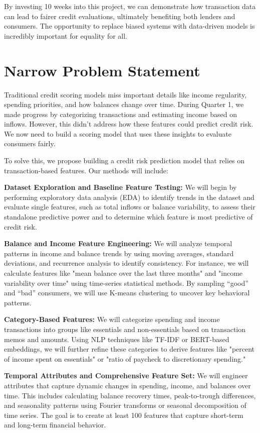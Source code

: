 \documentclass[12pt,letterpaper]{article}
\begin{document}
By investing 10 weeks into this project, we can demonstrate how transaction data can lead to fairer credit evaluations, ultimately benefiting both lenders and consumers. The opportunity to replace biased systems with data-driven models is incredibly important for equality for all.


\section{Narrow Problem Statement} Traditional credit scoring models miss important details like income regularity, spending priorities, and how balances change over time. During Quarter 1, we made progress by categorizing transactions and estimating income based on inflows. However, this didn’t address how these features could predict credit risk. We now need to build a scoring model that uses these insights to evaluate consumers fairly.

To solve this, we propose building a credit risk prediction model that relies on transaction-based features. Our methods will include:

\textbf{Dataset Exploration and Baseline Feature Testing:} We will begin by performing exploratory data analysis (EDA) to identify trends in the dataset and evaluate single features, such as total inflows or balance variability, to assess their standalone predictive power and to determine which feature is most predictive of credit risk.

\textbf{Balance and Income Feature Engineering:} We will analyze temporal patterns in income and balance trends by using moving averages, standard deviations, and recurrence analysis to identify consistency. For instance, we will calculate features like "mean balance over the last three months" and "income variability over time" using time-series statistical methods. By sampling “good” and “bad” consumers, we will use K-means clustering to uncover key behavioral patterns.

\textbf{Category-Based Features:} We will categorize spending and income transactions into groups like essentials and non-essentials based on transaction memos and amounts. Using NLP techniques like TF-IDF or BERT-based embeddings, we will further refine these categories to derive features like "percent of income spent on essentials" or "ratio of paycheck to discretionary spending."

\textbf{Temporal Attributes and Comprehensive Feature Set:} We will engineer attributes that capture dynamic changes in spending, income, and balances over time. This includes calculating balance recovery times, peak-to-trough differences, and seasonality patterns using Fourier transforms or seasonal decomposition of time series. The goal is to create at least 100 features that capture short-term and long-term financial behavior.
\end{document}
